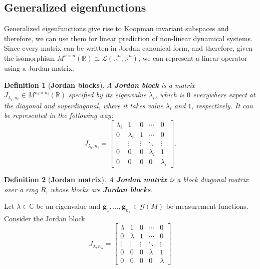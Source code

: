 \documentclass[]{article}
\newtheorem{definition}{Definition}
\begin{document}
\subsection{Generalized eigenfunctions}
Generalized eigenfunctions give rise to Koopman invariant subspaces and therefore, we can use them for linear prediction of non-linear dynamical systems. Since every matrix can be written in Jordan canonical form, and therefore, given the isomorphism $M^{n \times n}(\mathbb{R}) \cong \mathcal{L}(\mathbb{R}^n, \mathbb{R}^n)$, we can represent a linear operator using a Jordan matrix.
\begin{definition}[\textbf{Jordan blocks}]
A \textbf{Jordan block} is a matrix $J_{\lambda_i,n_i} \in M^{n_i \times n_i}(\mathbb{R})$ specified by its eigenvalue $\lambda_i$, which is $0$ everywhere expect at the diagonal and superdiagonal, where it takes value $\lambda_i$ and $1$, respectively. It can be represented in the following way:
\begin{equation}
	    J_{\lambda_i,n_i} = \begin{bmatrix}
		\lambda_i & 1 & 0 & \cdots & 0 \\
		0 & \lambda_i & 1 & \cdots & 0 \\
		\vdots & \vdots & \vdots & \ddots & \vdots \\
		0 & 0 & 0 & \lambda_i & 1 \\
		0 & 0 & 0 & 0 & \lambda_i
	\end{bmatrix}.
\end{equation}
\end{definition}
\begin{definition}[\textbf{Jordan matrix}]
A \textbf{Jordan matrix} is a block diagonal matrix over a ring $R$, whose blocks are \textbf{Jordan blocks}.
\end{definition}
Let $\lambda \in \mathbb{C}$ be an eigenvalue and $\textbf{g}_1,\dots,\textbf{g}_{n_\lambda} \in \mathcal{G}(M)$ be measurement functions. Consider the Jordan block
\begin{equation}
	J_{\lambda,n_{\lambda}} = \begin{bmatrix}
		\lambda & 1 & 0 & \cdots & 0 \\
		0 & \lambda & 1 & \cdots & 0 \\
		\vdots & \vdots & \vdots & \ddots & \vdots \\
		0 & 0 & 0 & \lambda & 1 \\
		0 & 0 & 0 & 0 & \lambda
	\end{bmatrix}
\end{equation}
\end{document}
